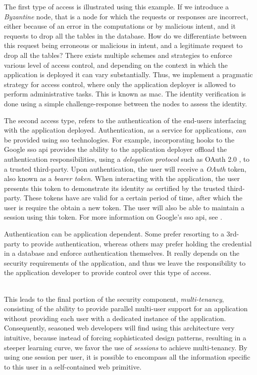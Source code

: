 \documentclass[12pt, titlepage]{uo_temp}
\begin{document}
     The first type of access is illustrated using this example. If we introduce a
     \emph{Byzantine} node, that is a node for which the requests or responses are
     incorrect, either because of an error in the computations or by malicious intent, and
     it requests to drop all the tables in the database. How do we differentiate between
     this request being erroneous or malicious in intent, and a legitimate request to drop
     all the tables? There exists multiple schemes and strategies to enforce various level
     of access control, and depending on the context in which the application is deployed
     it can vary substantially. Thus, we implement a pragmatic strategy for access
     control, where only the application deployer is allowed to perform administrative
     tasks. This is known as \gls{mac}. The identity verification is done using a simple
     challenge-response between the nodes to assess the identity.
     
     The second access type, refers to the authentication of the end-users interfacing
     with the application deployed. Authentication, as a service for applications,
     \emph{can} be provided using \gls{sso} technologies. For example, incorporating hooks
     to the Google \gls{sso} \gls{api} provides the ability to the application deployer
     offload the authentication responsibilities, using a \emph{delegation protocol} such
     as OAuth 2.0 \cite{jones2012oauth}, to a trusted third-party. Upon authentication,
     the user will receive a \emph{OAuth} token, also known as a \emph{bearer token}. When
     interacting with the application, the user presents this token to demonstrate its
     identity as certified by the trusted third-party. These tokens have are valid for a
     certain period of time, after which the user is require the obtain a new token. The
     user will also be able to maintain a session using this token. For more information
     on Google's \gls{sso} \gls{api}, see \cite{google_sso}.

     Authentication can be application dependent. Some prefer resorting to a 3rd-party to
     provide authentication, whereas others may prefer holding the credential in a
     database and enforce authentication themselves. It really depends on the security
     requirements of the application, and thus we leave the responsibility to the
     application developer to provide control over this type of access.

     \\ This leads to the final portion of the security component, \emph{multi-tenancy},
     consisting of the ability to provide parallel multi-user support for an application
     without providing each user with a dedicated instance of the application.
     Consequently, seasoned web developers will find using this architecture very
     intuitive, because instead of forcing sophisticated design patterns, resulting in a
     steeper learning curve, we favor the use of \emph{sessions} to achieve
     multi-tenancy. By using one session per user, it is possible to encompass all the
     information specific to this user in a self-contained web primitive.
\end{document}
